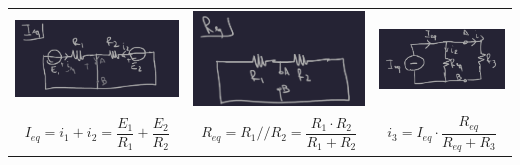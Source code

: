 \documentclass{article}
\begin{document}
\begin{center}
    \begin{tabular}{c c c}
        \includegraphics[scale=0.25]{Image/Esempio_Norton_1.png}&\includegraphics[scale=0.25]{Image/Esempio_Norton_2.png} & \includegraphics[scale=0.25]{Image/Esempio_Norton_3.png}\\
        $I_{eq} = i_1+i_2 = \dfrac{E_1}{R_1} + \dfrac{E_2}{R_2}$ & $R_{eq} = R_1 // R_2 = \dfrac{R_1 \cdot R_2}{R_1+R_2}$ & $i_3 = I_{eq} \cdot \dfrac{R_{eq}}{R_{eq}+R_3}$
    \end{tabular}
\end{center}
\end{document}
